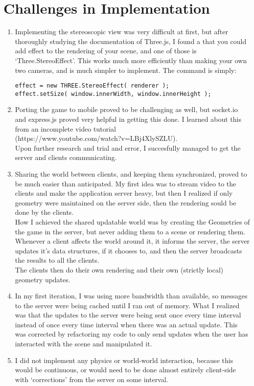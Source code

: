 \documentclass{article}
\renewcommand{\labelenumi}{\alph{enumi}.} %
\begin{document}
\section{Challenges in Implementation}

	
	\renewcommand{\labelenumi}{\alph{enumi}}
	\begin{enumerate}
		\item
			Implementing the stereoscopic view was very difficult at first, but after thoroughly studying the documentation of Three.js, I found a that you could add effect to the rendering of your scene, and one of those is `Three.StereoEffect'.  This works much more efficiently than making your own two cameras, and is much simpler to implement.  The command is simply:
		\begin{lstlisting}
effect = new THREE.StereoEffect( renderer ); 
effect.setSize( window.innerWidth, window.innerHeight );
		\end{lstlisting}
		\item
			Porting the game to mobile proved to be challenging as well, but socket.io and express.js proved very helpful in getting this done.  I learned about this from an incomplete video tutorial  \\
(https://www.youtube.com/watch?v=LBj4XlySZLU).  \\ Upon further research and trial and error, I succesfully managed to get the server and clients communicating.
		\item
			Sharing the world between clients, and keeping them synchronized, proved to be much easier than anticipated.  My first idea was to stream video to the clients and make the application server heavy, but then I realized if only geometry were maintained on the server side, then the rendering sould be done by the clients.  \\
		
		How I achieved the shared updatable world was by creating the Geometries of the game in the server, but never adding them to a scene or rendering them.  Whenever a client affects the world around it, it informs the server,  the server updates it's data structures, if it chooses to, and then the server broadcasts the results to all the clients.\\
		
		The clients then do their own rendering and their own (strictly local) geometry updates.
		\item
			In my first iteration, I was using more bandwidth than available, so messages to the server were being cached until I ran out of memory.  What I realized was that the updates to the server were being sent once every time interval instead of once every time interval when there was an actual update.  This was corrected by refactoring my code to only send updates when the user has interacted with the scene and manipulated it.
	\item
		I did not implement any physics or world-world interaction, because this would be continuous, or would need to be done almost entirely client-side with `corrections' from the server on some interval.
	\end{enumerate} \clearpage
	
\end{document}
